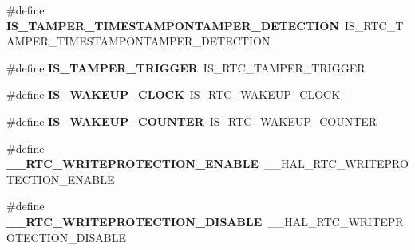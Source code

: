 \begin{DoxyCompactItemize}
\item 
\hypertarget{group___h_a_l___r_t_c___aliased___macros_ga7da808c5448f1ebf7f29c44dee830446}{\#define {\bfseries I\-S\-\_\-\-T\-A\-M\-P\-E\-R\-\_\-\-T\-I\-M\-E\-S\-T\-A\-M\-P\-O\-N\-T\-A\-M\-P\-E\-R\-\_\-\-D\-E\-T\-E\-C\-T\-I\-O\-N}~I\-S\-\_\-\-R\-T\-C\-\_\-\-T\-A\-M\-P\-E\-R\-\_\-\-T\-I\-M\-E\-S\-T\-A\-M\-P\-O\-N\-T\-A\-M\-P\-E\-R\-\_\-\-D\-E\-T\-E\-C\-T\-I\-O\-N}\label{group___h_a_l___r_t_c___aliased___macros_ga7da808c5448f1ebf7f29c44dee830446}

\item 
\hypertarget{group___h_a_l___r_t_c___aliased___macros_gaa0fe0373701cfd583ae46173a60248b2}{\#define {\bfseries I\-S\-\_\-\-T\-A\-M\-P\-E\-R\-\_\-\-T\-R\-I\-G\-G\-E\-R}~I\-S\-\_\-\-R\-T\-C\-\_\-\-T\-A\-M\-P\-E\-R\-\_\-\-T\-R\-I\-G\-G\-E\-R}\label{group___h_a_l___r_t_c___aliased___macros_gaa0fe0373701cfd583ae46173a60248b2}

\item 
\hypertarget{group___h_a_l___r_t_c___aliased___macros_ga85becc3221346e2b872ca8f205776a47}{\#define {\bfseries I\-S\-\_\-\-W\-A\-K\-E\-U\-P\-\_\-\-C\-L\-O\-C\-K}~I\-S\-\_\-\-R\-T\-C\-\_\-\-W\-A\-K\-E\-U\-P\-\_\-\-C\-L\-O\-C\-K}\label{group___h_a_l___r_t_c___aliased___macros_ga85becc3221346e2b872ca8f205776a47}

\item 
\hypertarget{group___h_a_l___r_t_c___aliased___macros_ga806f88006a410ad9a990d4b1dff449f4}{\#define {\bfseries I\-S\-\_\-\-W\-A\-K\-E\-U\-P\-\_\-\-C\-O\-U\-N\-T\-E\-R}~I\-S\-\_\-\-R\-T\-C\-\_\-\-W\-A\-K\-E\-U\-P\-\_\-\-C\-O\-U\-N\-T\-E\-R}\label{group___h_a_l___r_t_c___aliased___macros_ga806f88006a410ad9a990d4b1dff449f4}

\item 
\hypertarget{group___h_a_l___r_t_c___aliased___macros_gad93d3e4b8add5593e8a4c0ee4b60c659}{\#define {\bfseries \-\_\-\-\_\-\-R\-T\-C\-\_\-\-W\-R\-I\-T\-E\-P\-R\-O\-T\-E\-C\-T\-I\-O\-N\-\_\-\-E\-N\-A\-B\-L\-E}~\-\_\-\-\_\-\-H\-A\-L\-\_\-\-R\-T\-C\-\_\-\-W\-R\-I\-T\-E\-P\-R\-O\-T\-E\-C\-T\-I\-O\-N\-\_\-\-E\-N\-A\-B\-L\-E}\label{group___h_a_l___r_t_c___aliased___macros_gad93d3e4b8add5593e8a4c0ee4b60c659}

\item 
\hypertarget{group___h_a_l___r_t_c___aliased___macros_ga50e1d57530318f33dfa59d44c3f086ce}{\#define {\bfseries \-\_\-\-\_\-\-R\-T\-C\-\_\-\-W\-R\-I\-T\-E\-P\-R\-O\-T\-E\-C\-T\-I\-O\-N\-\_\-\-D\-I\-S\-A\-B\-L\-E}~\-\_\-\-\_\-\-H\-A\-L\-\_\-\-R\-T\-C\-\_\-\-W\-R\-I\-T\-E\-P\-R\-O\-T\-E\-C\-T\-I\-O\-N\-\_\-\-D\-I\-S\-A\-B\-L\-E}\label{group___h_a_l___r_t_c___aliased___macros_ga50e1d57530318f33dfa59d44c3f086ce}

\end{DoxyCompactItemize}


